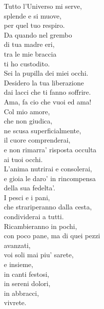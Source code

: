 \begin{haiku}
{Tutto l'Universo mi serve,\\
splende e si muove,\\
per quel tuo respiro.\\
Da quando nel grembo \\
di tua madre eri,\\
tra le mie braccia\\
ti ho custodito.\\
Sei la pupilla dei miei occhi.\\
Desidero la tua liberazione\\
dai lacci che ti fanno soffrire.\\
Ama, fa cio che vuoi ed ama!\\
Col mio amore,\\
che non giudica,\\
ne scusa superficialmente,\\
il cuore comprenderai,\\
e non rimarra' risposta occulta\\
ai tuoi occhi.\\
L'anima nutrirai e consolerai,\\
e gioia le daro' in rincompensa\\
della sua fedelta'.\\
I pesci e i pani,\\
che strariperanno dalla cesta,\\
condividerai a tutti.\\
Ricambieranno in pochi,\\
con poco pane, ma di quei pezzi\\
avanzati, \\
voi soli mai piu' sarete,\\
e insieme, \\
in canti festosi,\\
in sereni dolori,\\
in abbracci,\\
vivrete.\\
}
\end{haiku}

